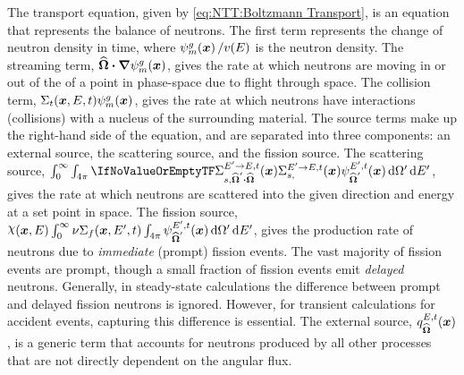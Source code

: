 {{        The transport equation, given by \cref{eq:NTT:Boltzmann Transport}, is an equation that represents the balance of neutrons.
        The first term represents the change of neutron density in time, where $\aflux / v(E)$ is the neutron density.
        The streaming term, $\dir\vdot\grad\aflux$, gives the rate at which neutrons are moving in or out of the of a point in phase-space due to flight through space.
        The collision term, $\xst[\loc][E,t]\aflux$, gives the rate at which neutrons have interactions (collisions) with a nucleus of the surrounding material.
        The source terms make up the right-hand side of the equation, and are separated into three components: an external source, the scattering source, and the fission source.
        The scattering source, $\intl[0][\infty]\intl[\fourpi]\xss[][\loc][\dirprime\vdot\dir][\Eprime\to E,t]\aflux[\loc][\dirprime][\Eprime,t]\ddirprime\dif{\Eprime}$, gives the rate at which neutrons are scattered into the given direction and energy at a set point in space.
        The fission source, $\spect\intl[0][\infty]\nufis[\loc][\Eprime,t]\intl[\fourpi]\aflux[\loc][\dirprime][\Eprime,t]\ddirprime\dif{\Eprime}$, gives the production rate of neutrons due to \emph{immediate} (prompt) fission events.
        The vast majority of fission events are prompt, though a small fraction of fission events emit \emph{delayed} neutrons.
        Generally, in steady-state calculations the difference between prompt and delayed fission neutrons is ignored.
        However, for transient calculations for accident events, capturing this difference is essential.
        The external source, $\source[\loc][\dir][E,t]$, is a generic term that accounts for neutrons produced by all other processes that are not directly dependent on the angular flux.

}}
